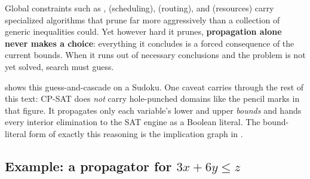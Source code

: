 Global constraints such as
,  (scheduling),  (routing),
and  (resources) carry specialized algorithms that prune far
more aggressively than a collection of generic inequalities could. Yet however
hard it prunes, \textbf{propagation alone never makes a choice}: everything it
concludes is a forced consequence of the current bounds. When it runs out of
necessary conclusions and the problem is not yet solved, search must guess.

 shows this guess-and-cascade on a Sudoku. One caveat
carries through the rest of this text: CP-SAT does \emph{not} carry hole-punched
domains like the pencil marks in that figure. It propagates only each variable's
lower and upper \emph{bounds} and hands every interior elimination to the SAT
engine as a Boolean literal. The bound-literal form of exactly this reasoning is
the implication graph in .

\subsection{Example: a propagator for $3x + 6y \le z$}\label{sec:onepropagator}

